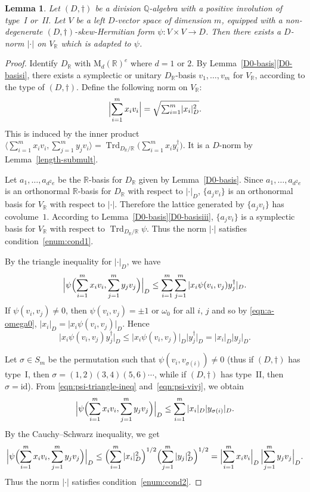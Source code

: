 \documentclass[11pt]{article}
\numberwithin{equation}{section}
\newcommand{\bQ}{\mathbb{Q}}
\newcommand{\bR}{\mathbb{R}}
\newcommand{\rM}{\mathrm{M}}
\DeclareMathOperator{\Trd}{Trd}
\newcommand{\id}{\mathrm{id}}
\newcommand{\abs}[1]{\lvert #1 \rvert}
\newcommand{\Bigabs}[1]{\Bigl\lvert #1 \Bigr\rvert}
\newtheorem{lemma}{Lemma}[section]
\begin{document}
\begin{lemma} \label{good-norm}
Let $(D,\dag)$ be a division $\bQ$-algebra with a positive involution of type~I or~II.
Let $V$ be a left $D$-vector space of dimension $m$, equipped with a non-degenerate $(D,\dag)$-skew-Hermitian form $\psi \colon V \times V \to D$.
Then there exists a $D$-norm $\abs{\cdot}$ on $V_\bR$ which is adapted to $\psi$.
\end{lemma}
\begin{proof}
Identify $D_\bR$ with $\rM_d(\bR)^e$ where $d = 1$ or $2$.
By Lemma~\ref{D0-basis}\eqref{D0-basisi}, there exists a symplectic or unitary $D_\bR$-basis $v_1, \dotsc, v_m$ for $V_\bR$, according to the type of $(D,\dag)$.
Define the following norm on $V_\bR$:
\[
\Bigabs{\sum_{i=1}^m x_i v_i} = \sqrt{\textstyle\sum_{i=1}^m \abs{x_i}_D^2}.
\]
This is induced by the inner product $\bigl\langle \sum_{i=1}^m x_i v_i, \sum_{j=1}^m y_j v_i \bigr\rangle = \Trd_{D_\bR/\bR} \bigl(\sum_{i=1}^m x_i y_i^\dag\bigr)$.
It is a $D$-norm by Lemma~\ref{length-submult}.

Let $a_1, \dotsc, a_{d^2e}$ be the $\bR$-basis for $D_\bR$ given by Lemma~\ref{D0-basis}.
Since $a_1, \dotsc, a_{d^2e}$ is an orthonormal $\bR$-basis for $D_\bR$ with respect to $\abs{\cdot}_D$,
$\{ a_j v_i \}$ is an orthonormal basis for $V_\bR$ with respect to $\abs{\cdot}$.
Therefore the lattice generated by $\{ a_j v_i \}$ has covolume~$1$.
According to Lemma~\ref{D0-basis}\eqref{D0-basisiii}, $\{ a_j v_i \}$ is a symplectic basis for $V_\bR$ with respect to $\Trd_{D_\bR/\bR} \psi$.
Thus the norm $\abs{\cdot}$ satisfies condition~\eqref{enum:cond1}.

By the triangle inequality for $\abs{\cdot}_D$, we have
\begin{equation} \label{eqn:psi-triangle-ineq}
\Bigabs{\psi \Bigl( \sum_{i=1}^m x_i v_i, \sum_{j=1}^m y_j v_j \Bigr)}_D
\leq \sum_{i=1}^m \sum_{j=1}^m\, \abs{x_i \psi(v_i, v_j) y_j^\dag}_D.
\end{equation}
If $\psi(v_i, v_j) \neq 0$, then $\psi(v_i, v_j) = \pm 1$ or $\omega_0$ for all $i$, $j$ and so by \eqref{eqn:a-omega0},
$\abs{x_i}_D = \abs{x_i \psi(v_i, v_j)}_D$. Hence
\begin{equation} \label{eqn:psi-vivj}
\abs{x_i \psi(v_i, v_j) y_j^\dag}_D \leq \abs{x_i \psi(v_i, v_j)}_D \abs{y_j^\dag}_D = \abs{x_i}_D \abs{y_j}_D.
\end{equation}

Let $\sigma \in S_m$ be the permutation such that $\psi(v_i, v_{\sigma(i)}) \neq 0$ (thus if $(D,\dag)$ has type~I, then $\sigma = (1,2)(3,4)(5,6)\dotsm$, while if $(D,\dag)$ has type~II, then $\sigma=\id$).
From \eqref{eqn:psi-triangle-ineq} and~\eqref{eqn:psi-vivj}, we obtain
\[
\Bigabs{\psi \Bigl( \sum_{i=1}^m x_i v_i, \sum_{j=1}^m y_j v_j \Bigr)}_D
\leq \sum_{i=1}^m\, \abs{x_i}_D \abs{y_{\sigma(i)}}_D.
\]
By the Cauchy--Schwarz inequality, we get
\[
\Bigabs{\psi \Bigl( \sum_{i=1}^m x_i v_i, \sum_{j=1}^m y_j v_j \Bigr)}_D
\leq \Bigl( \sum_{i=1}^m\, \abs{x_i}_D^2 \Bigr)^{1/2} \Bigl( \sum_{j=1}^m\, \abs{y_j}_D^2 \Bigr)^{1/2}
= \Bigabs{\sum_{i=1}^m x_iv_i}_D \, \Bigabs{\sum_{j=1}^m y_jv_j}_D.
\]
Thus the norm $\abs{\cdot}$ satisfies condition~\eqref{enum:cond2}.
\end{proof}
\end{document}
